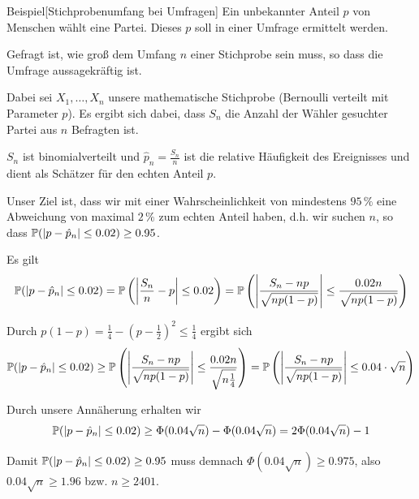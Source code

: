 \begin{colbox}{Beispiel}[Stichprobenumfang bei Umfragen]
    Ein unbekannter Anteil $p$ von Menschen wählt eine Partei. Dieses $p$ soll in einer Umfrage ermittelt werden.

    Gefragt ist, wie groß dem Umfang $n$ einer Stichprobe sein muss, so dass die Umfrage aussagekräftig ist.

    Dabei sei $X_1,\dots,X_n$ unsere mathematische Stichprobe (Bernoulli verteilt mit Parameter $p$). Es ergibt 
    sich dabei, dass $S_n$ die Anzahl der Wähler gesuchter Partei aus $n$ Befragten ist. 

    $S_n$ ist binomialverteilt und $\hat{p}_n = \tfrac{S_n}{n}$ ist die relative Häufigkeit des Ereignisses und dient 
    als Schätzer für den echten Anteil $p$. 

    Unser Ziel ist, dass wir mit einer Wahrscheinlichkeit von mindestens $95\,\%$ eine Abweichung von maximal $2\,\%$ 
    zum echten Anteil haben, d.h. wir suchen $n$, so dass $\P(|p-\hat{p}_n|\leq 0.02)\geq 0.95$. 

    Es gilt
    \[
        \P(|p-\hat{p}_n|\leq 0.02) 
        = \P\left(\left|\dfrac{S_n}{n}-p\right|\leq 0.02\right) 
        = \P\left(\left|\dfrac{S_n-np}{\sqrt{np(1-p)}}\right|\leq \dfrac{0.02n}{\sqrt{np(1-p)}}\right)
    \]

    Durch $p(1-p)=\tfrac{1}{4} - (p-\tfrac{1}{2})^2 \leq \tfrac{1}{4}$ ergibt sich 
    \[
        \P(|p-\hat{p}_n|\leq 0.02) 
        \geq \P\left(\left|\dfrac{S_n-np}{\sqrt{np(1-p)}}\right|\leq \dfrac{0.02n}{\sqrt{n\tfrac{1}{4}}}\right)
        = \P\left(\left|\dfrac{S_n-np}{\sqrt{np(1-p)}}\right|\leq 0.04\cdot\sqrt{n}\right)
    \]

    Durch unsere Annäherung erhalten wir 
    \[
        \P(|p-\hat{p}_n|\leq 0.02) \geq \Phi(0.04\sqrt{n}) - \Phi(0.04\sqrt{n}) = 2\Phi(0.04\sqrt{n}) - 1
    \]

    Damit $\P(|p-\hat{p}_n|\leq 0.02)\geq 0.95$ muss demnach $\Phi(0.04\sqrt{n})\geq 0.975$, also $0.04\sqrt{n}\geq 1.96$
    bzw. $n\geq 2401$.
\end{colbox}

